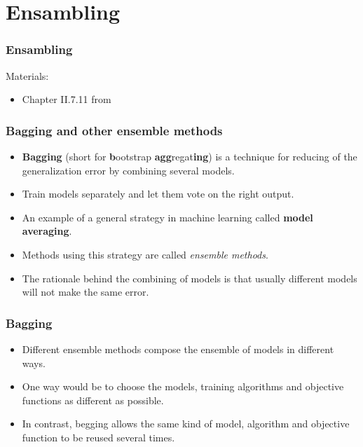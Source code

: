 \documentclass[notes]{beamer}          %
\begin{document}
\section{Ensambling}

\begin{frame}
\frametitle{Ensambling}
Materials:
\begin{itemize}
    \item Chapter II.7.11 from \cite{deeplearning}
\end{itemize}
\end{frame}

\begin{frame}
\frametitle{Bagging and other ensemble methods}
    \begin{itemize}
        \item {\bf Bagging} (short for {\bf b}ootstrap {\bf agg}regat{\bf ing}) is a technique for reducing of the generalization error by combining several models.
        \item Train models separately and let them vote on the right output.
        \item An example of a general strategy in machine learning called {\bf model averaging}.
        \item Methods using this strategy are called {\em ensemble methods}.
        \item The rationale behind the combining of models is that usually different models will not make the same error.
    \end{itemize}
\end{frame}


\begin{frame}
\frametitle{Bagging}
    \begin{itemize}
        \item Different ensemble methods compose the ensemble of models in different ways.
        \item One way would be to choose the models, training algorithms and objective functions as different as possible.
        \item In contrast, begging allows the same kind of model, algorithm and objective function to be reused several times.
    \end{itemize}

\end{frame}
\end{document}
